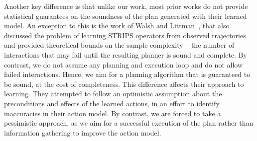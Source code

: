 \documentclass{article}
\begin{document}
	
	Another key difference is that unlike our work, most prior works do not provide statistical guarantees on the soundness of the plan generated with their learned model.
	An exception to this is the work of Walsh and Littman~, that also discussed the problem of learning STRIPS operators from observed trajectories and provided theoretical bounds on the sample complexity -- the number of interactions that may fail until the resulting planner is  sound and complete.  By contrast, we do not assume any planning and execution loop and do not allow failed interactions. Hence, we aim for a planning algorithm that is guaranteed to be sound, at the cost of completeness. This difference affects their approach to learning. They attempted to follow an optimistic assumption about the preconditions and effects of the learned actions, in an effort to identify inaccuracies in their action model. By contrast, we are forced to take a pessimistic approach, as we aim for a successful execution of the plan rather than information gathering to improve the action model. 
	
	
\end{document}
